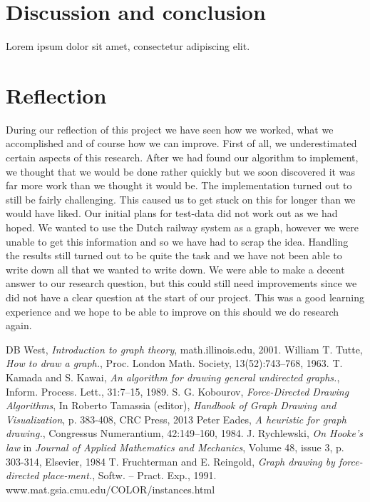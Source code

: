 \documentclass[a4paper,12pt]{article}
\begin{document}
\section{Discussion and conclusion}
Lorem ipsum dolor sit amet, consectetur adipiscing elit.

\section{Reflection}
During our reflection of this project we have seen how we worked, what we accomplished and of course how we can improve. First of all, we underestimated certain aspects of this research. After we had found our algorithm to implement, we thought that we would be done rather quickly but we soon discovered it was far more work than we thought it would be. The implementation turned out to still be fairly challenging. This caused us to get stuck on this for longer than we would have liked. Our initial plans for test-data did not work out as we had hoped. We wanted to use the Dutch railway system as a graph, however we were unable to get this information and so we have had to scrap the idea. Handling the results still turned out to be quite the task and we have not been able to write down all that we wanted to write down. We were able to make a decent answer to our research question, but this could still need improvements since we did not have a clear question at the start of our project. This was a good learning experience and we hope to be able to improve on this should we do research again.


\begin{thebibliography}{99}
DB West, \emph{Introduction to graph theory}, math.illinois.edu, 2001.
William T. Tutte, \emph{How to draw a graph.}, Proc. London Math. Society, 13(52):743–768, 1963.
T. Kamada and S. Kawai, \emph{An algorithm for drawing general undirected graphs.}, Inform. Process. Lett., 31:7–15, 1989.
S. G. Kobourov, \emph{Force-Directed Drawing Algorithms}, In Roberto Tamassia (editor), \emph{Handbook of Graph Drawing and Visualization}, p. 383-408, CRC Press, 2013
 Peter Eades, \emph{A heuristic for graph drawing.}, Congressus Numerantium, 42:149–160, 1984.
 J. Rychlewski, \emph{On Hooke's law} in \emph{Journal of Applied Mathematics and Mechanics}, Volume 48, issue 3, p. 303-314, Elsevier, 1984
T. Fruchterman and E. Reingold, \emph{Graph drawing by force-directed place-ment.}, Softw. – Pract. Exp., 1991.
 www.mat.gsia.cmu.edu/COLOR/instances.html
\end{thebibliography}
\end{document}
